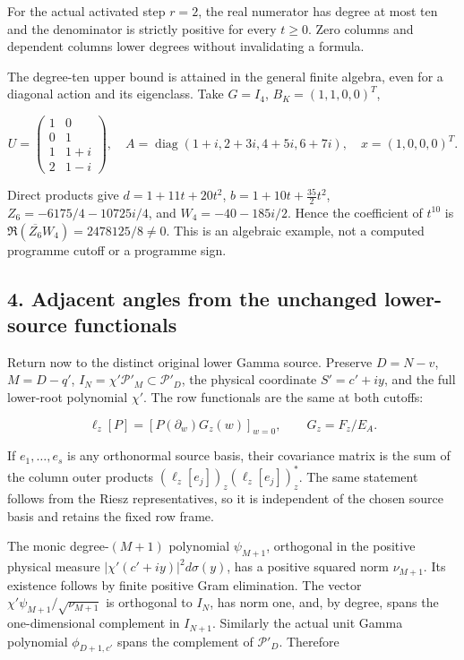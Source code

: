 \documentclass[11pt]{article}
\begin{document}
For the actual activated step \(r=2\), the real numerator has degree at most ten and the denominator is strictly positive for every \(t\ge0\). Zero columns and dependent columns lower degrees without invalidating a formula.

The degree-ten upper bound is attained in the general finite algebra, even for a diagonal action and its eigenclass. Take \(G=I_4\), \(B_K=(1,1,0,0)^T\),

\[
U=\begin{pmatrix}1&0\\0&1\\1&1+i\\2&1-i\end{pmatrix},\quad
A=\operatorname{diag}(1+i,2+3i,4+5i,6+7i),\quad x=(1,0,0,0)^T.
\]

Direct products give \(d=1+11t+20t^2\), \(b=1+10t+\tfrac{35}{2}t^2\), \(Z_6=-6175/4-10725i/4\), and \(W_4=-40-185i/2\). Hence the coefficient of \(t^{10}\) is \(\Re(\overline{Z_6}W_4)=2478125/8\ne0\). This is an algebraic example, not a computed programme cutoff or a programme sign.

\subsection{4. Adjacent angles from the unchanged lower-source functionals}\label{adjacent-angles-from-the-unchanged-lower-source-functionals}

Return now to the distinct original lower Gamma source. Preserve \(D=N-v\), \(M=D-q'\), \(I_N=\chi'\mathcal P'_M\subset\mathcal P'_D\), the physical coordinate \(S'=c'+iy\), and the full lower-root polynomial \(\chi'\). The row functionals are the same at both cutoffs:

\[
\ell_z[P]=[P(\partial_w)G_z(w)]_{w=0},\qquad G_z=F_z/E_A.
\]

If \(e_1,\dots,e_s\) is any orthonormal source basis, their covariance matrix is the sum of the column outer products \((\ell_z[e_j])_z(\ell_z[e_j])_z^*\). The same statement follows from the Riesz representatives, so it is independent of the chosen source basis and retains the fixed row frame.

The monic degree-\((M+1)\) polynomial \(\psi_{M+1}\), orthogonal in the positive physical measure \(|\chi'(c'+iy)|^2d\sigma(y)\), has a positive squared norm \(\nu_{M+1}\). Its existence follows by finite positive Gram elimination. The vector \(\chi'\psi_{M+1}/\sqrt{\nu_{M+1}}\) is orthogonal to \(I_N\), has norm one, and, by degree, spans the one-dimensional complement in \(I_{N+1}\). Similarly the actual unit Gamma polynomial \(\phi_{D+1,c'}\) spans the complement of \(\mathcal P'_D\). Therefore
\end{document}

